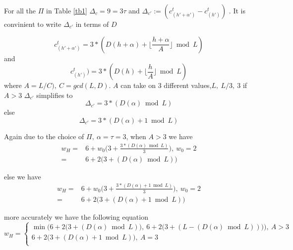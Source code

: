\documentclass[11pt, oneside, dvipdfmx]{book}
\begin{document}
For all the $\Pi$ in Table \ref{tb1} $\Delta_c = 9=3\tau$ and $\Delta_{c'}:=(c_{(h'+\alpha')}^{t}-c_{(h')}^{t})$ . It is convinient to write $\Delta_{c'}$ in terms of $D$ 

$$c_{(h'+\alpha')}^{t}=3*(D(h+\alpha)+ \lfloor \frac{h+\alpha}{A} \rfloor \bmod L)$$ and $$c_{(h')}^{t})=3*(D(h)+ \lfloor \frac{h}{A} \rfloor \bmod L)$$
where $A=L/C),~C=gcd(L,D)$. 
$A$ can take on $3$ different values,$L,~L/3,~3$
if $A>3$ $\Delta_{c'}$ simplifies to $$\Delta_{c'}=3*(D(\alpha) \bmod L)$$ else $$\Delta_{c'}=3*(D(\alpha) +1\bmod L)$$ 

Again due to the choice of $\Pi,~\alpha=\tau=3$, when $A>3$ we have 
\begin{equation*}
\begin{split}
w_H=&6+w_0\Big(3+\frac{3*(D(\alpha) \bmod L)}{3}\Big),~w_0=2\\
=&6+2\Big(3+(D(\alpha) \bmod L)\Big)
\end{split}
\end{equation*}

else we have 
\begin{equation*}
\begin{split}
w_H=&6+w_0\Big(3+\frac{3*(D(\alpha) +1 \bmod L)}{3}\Big),~w_0=2\\
=&6+2\Big(3+(D(\alpha)+1 \bmod L)\Big)
\end{split}
\end{equation*}

more accurately we have the following equation
\begin{equation}
w_H=
\begin{cases}
\min \Bigg (6+2\Big(3+(D(\alpha) \bmod L)\Big),~6+2\Big(3+(L-(D(\alpha) \bmod L))\Big)\Bigg), ~A>3 \\
6+2\Big(3+(D(\alpha)+1 \bmod L)\Big), ~A=3\\

\end{cases}
\label{eq9}
\end{equation}


\end{document}

